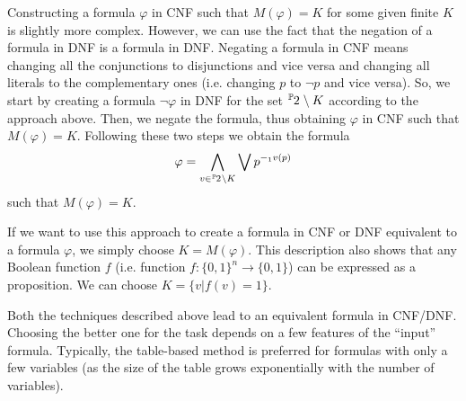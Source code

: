 Constructing a formula $\varphi$ in CNF such that $M(\varphi) = K$ for some given finite $K$ is slightly more complex. However, we can use the fact that the negation of a formula in DNF is a formula in DNF. Negating a formula in CNF means changing all the conjunctions to disjunctions and vice versa and changing all literals to the complementary ones (i.e. changing $p$ to $\neg p$ and vice versa). So, we start by creating a formula $\neg \varphi$ in DNF for the set $\fset{\Prop}{2} \setminus K$ according to the approach above. Then, we negate the formula, thus obtaining $\varphi$ in CNF such that $M(\varphi)=K$. Following these two steps we obtain the formula $$\varphi = \Land_{v \in \fset{\Prop}{2} \setminus K}\Lor p^{-_1v(p)}$$ such that $M(\varphi) = K$.

If we want to use this approach to create a formula in CNF or DNF equivalent to a formula $\varphi$, we simply choose $K=M(\varphi)$. This description also shows that any Boolean function $f$ (i.e. function $f: \{0,1\}^n \to \{0,1\}$) can be expressed as a proposition. We can choose $K = \{v | f(v) = 1\}$. 

Both the techniques described above lead to an equivalent formula in CNF/DNF. Choosing the better one for the task depends on a few features of the ``input'' formula. Typically, the table-based method is preferred for formulas with only a few variables (as the size of the table grows exponentially with the number of variables). 
